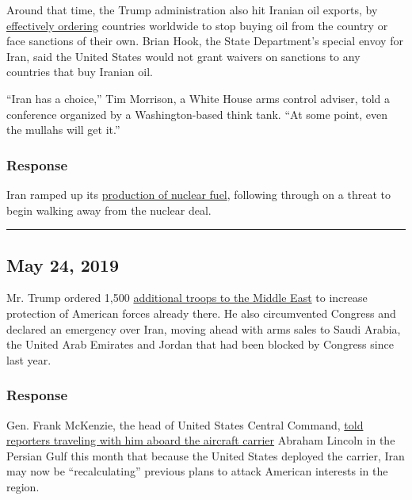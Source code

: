 Around that time, the Trump administration also hit Iranian oil exports,
by
\href{https://www.nytimes.com/2019/04/22/world/middleeast/us-iran-oil-sanctions-.html}{effectively
ordering} countries worldwide to stop buying oil from the country or
face sanctions of their own. Brian Hook, the State Department's special
envoy for Iran, said the United States would not grant waivers on
sanctions to any countries that buy Iranian oil.

``Iran has a choice,'' Tim Morrison, a White House arms control adviser,
told a conference organized by a Washington-based think tank. ``At some
point, even the mullahs will get it.''

\hypertarget{response-3}{%
\subsubsection{\texorpdfstring{\textbf{Response}}{Response}}\label{response-3}}

Iran ramped up its
\href{https://www.nytimes.com/2019/06/10/us/politics/iran-iaea-nuclear-fuel.html}{production
of nuclear fuel}, following through on a threat to begin walking away
from the nuclear deal.

\begin{center}\rule{0.5\linewidth}{\linethickness}\end{center}

\hypertarget{may-24-2019}{%
\subsection{May 24, 2019}\label{may-24-2019}}

Mr. Trump ordered 1,500
\href{https://www.nytimes.com/2019/05/24/world/middleeast/trump-troop-increase-middle-east-iran.html}{additional
troops to the Middle East} to increase protection of American forces
already there. He also circumvented Congress and declared an emergency
over Iran, moving ahead with arms sales to Saudi Arabia, the United Arab
Emirates and Jordan that had been blocked by Congress since last year.

\hypertarget{response-4}{%
\subsubsection{\texorpdfstring{\textbf{Response}}{Response}}\label{response-4}}

Gen. Frank McKenzie, the head of United States Central Command,
\href{https://www.navytimes.com/news/your-navy/2019/06/08/carrier-sends-message-to-iran/}{told
reporters traveling with him aboard the aircraft carrier} Abraham
Lincoln in the Persian Gulf this month that because the United States
deployed the carrier, Iran may now be ``recalculating'' previous plans
to attack American interests in the region.


